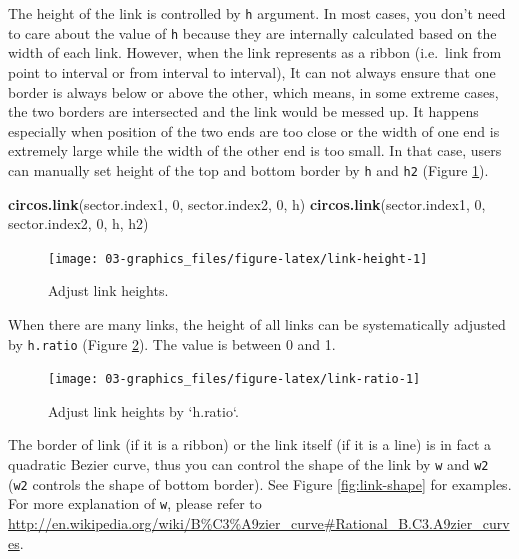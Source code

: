 \documentclass[]{book}
\newenvironment{Shaded}{\begin{snugshade}}{\end{snugshade}}
\newcommand{\KeywordTok}[1]{\textcolor[rgb]{0.13,0.29,0.53}{\textbf{#1}}}
\newcommand{\DecValTok}[1]{\textcolor[rgb]{0.00,0.00,0.81}{#1}}
\newcommand{\NormalTok}[1]{#1}
\theoremstyle{definition}
\theoremstyle{definition}
\theoremstyle{remark}
\begin{document}
The height of the link is controlled by \texttt{h} argument. In most
cases, you don't need to care about the value of \texttt{h} because they
are internally calculated based on the width of each link. However, when
the link represents as a ribbon (i.e.~link from point to interval or
from interval to interval), It can not always ensure that one border is
always below or above the other, which means, in some extreme cases, the
two borders are intersected and the link would be messed up. It happens
especially when position of the two ends are too close or the width of
one end is extremely large while the width of the other end is too
small. In that case, users can manually set height of the top and bottom
border by \texttt{h} and \texttt{h2} (Figure \ref{fig:link-height}).

\begin{Shaded}
\begin{Highlighting}[]
\KeywordTok{circos.link}\NormalTok{(sector.index1, }\DecValTok{0}\NormalTok{, sector.index2, }\DecValTok{0}\NormalTok{, h)}
\KeywordTok{circos.link}\NormalTok{(sector.index1, }\DecValTok{0}\NormalTok{, sector.index2, }\DecValTok{0}\NormalTok{, h, h2)}
\end{Highlighting}
\end{Shaded}

\begin{figure}

{\centering \texttt{[image: 03-graphics\_files/figure-latex/link-height-1]} 

}

\caption{Adjust link heights.}\label{fig:link-height}
\end{figure}

When there are many links, the height of all links can be systematically
adjusted by \texttt{h.ratio} (Figure \ref{fig:link-ratio}). The value is
between 0 and 1.

\begin{figure}

{\centering \texttt{[image: 03-graphics\_files/figure-latex/link-ratio-1]} 

}

\caption{Adjust link heights by `h.ratio`.}\label{fig:link-ratio}
\end{figure}

The border of link (if it is a ribbon) or the link itself (if it is a
line) is in fact a quadratic Bezier curve, thus you can control the
shape of the link by \texttt{w} and \texttt{w2} (\texttt{w2} controls
the shape of bottom border). See Figure \ref{fig:link-shape} for
examples. For more explanation of \texttt{w}, please refer to
\url{http://en.wikipedia.org/wiki/B\%C3\%A9zier_curve\#Rational_B.C3.A9zier_curves}.
\end{document}
